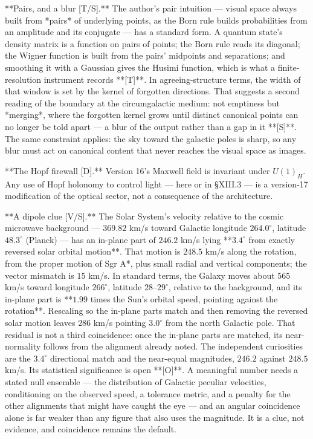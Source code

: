 **Pairs, and a blur [T/S].** The author's pair intuition — visual space always built from *pairs* of underlying points, as the Born rule builds probabilities from an amplitude and its conjugate — has a standard form. A quantum state's density matrix is a function on pairs of points; the Born rule reads its diagonal; the Wigner function is built from the pairs' midpoints and separations; and smoothing it with a Gaussian gives the Husimi function, which is what a finite-resolution instrument records **[T]**. In agreeing-structure terms, the width of that window is set by the kernel of forgotten directions. That suggests a second reading of the boundary at the circumgalactic medium: not emptiness but *merging*, where the forgotten kernel grows until distinct canonical points can no longer be told apart — a blur of the output rather than a gap in it **[S]**. The same constraint applies: the sky toward the galactic poles is sharp, so any blur must act on canonical content that never reaches the visual space as images.

**The Hopf firewall [D].** Version 16's Maxwell field is invariant under $U(1)_H$. Any use of Hopf holonomy to control light — here or in §XIII.3 — is a version-17 modification of the optical sector, not a consequence of the architecture.

**A dipole clue [V/S].** The Solar System's velocity relative to the cosmic microwave background — $369.82$ km/s toward Galactic longitude $264.0^\circ$, latitude $48.3^\circ$ (Planck) — has an in-plane part of $246.2$ km/s lying **$3.4^\circ$ from exactly reversed solar orbital motion**. That motion is $248.5$ km/s along the rotation, from the proper motion of Sgr A*, plus small radial and vertical components; the vector mismatch is $15$ km/s. In standard terms, the Galaxy moves about $565$ km/s toward longitude $266^\circ$, latitude $28$–$29^\circ$, relative to the background, and its in-plane part is **$1.99$ times the Sun's orbital speed, pointing against the rotation**. Rescaling so the in-plane parts match and then removing the reversed solar motion leaves $286$ km/s pointing $3.0^\circ$ from the north Galactic pole. That residual is not a third coincidence: once the in-plane parts are matched, its near-normality follows from the alignment already noted. The independent curiosities are the $3.4^\circ$ directional match and the near-equal magnitudes, $246.2$ against $248.5$ km/s. Its statistical significance is open **[O]**. A meaningful number needs a stated null ensemble — the distribution of Galactic peculiar velocities, conditioning on the observed speed, a tolerance metric, and a penalty for the other alignments that might have caught the eye — and an angular coincidence alone is far weaker than any figure that also uses the magnitude. It is a clue, not evidence, and coincidence remains the default.

